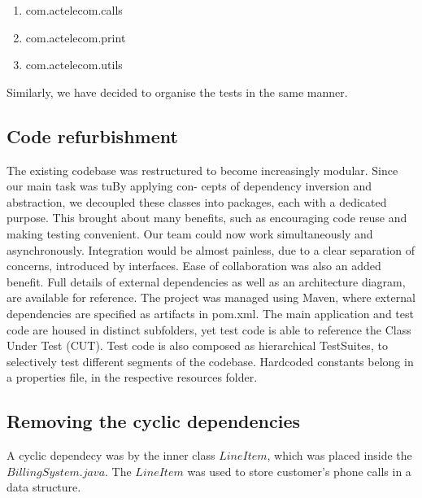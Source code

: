 \documentclass[11pt,twocolumn]{article} %
\begin{document}
\begin{enumerate}
 \item{com.actelecom.calls}
 \item{com.actelecom.print}
 \item{com.actelecom.utils}
\end{enumerate}

Similarly, we have decided to organise the tests in the same manner.




\iffalse
\subsection{Handling the cyclic dependencies}
This was caused by an inner LineItem class within BillingSystem. This was required by
BillGenerator, as it was populating a data structure containing all phone calls made by
customers.
To solve this, LineItem was extracted out into the com.acmetelecom.util subpackage,
thus removing this cyclic dependency, and at the same time, evolving the overall system
towards a more reasonable structure.
\fi

\subsection{Code refurbishment}
The existing codebase was restructured to become increasingly modular. Since our main task was tuBy applying con-
cepts of dependency inversion and abstraction, we decoupled these classes into packages,
each with a dedicated purpose.
This brought about many benefits, such as encouraging code reuse and making testing
convenient. Our team could now work simultaneously and asynchronously. Integration
would be almost painless, due to a clear separation of concerns, introduced by interfaces.
Ease of collaboration was also an added benefit.
Full details of external dependencies as well as an architecture diagram, are available for reference.
The project was managed using Maven, where external dependencies are specified as
artifacts in pom.xml. The main application and test code are housed in distinct subfolders,
yet test code is able to reference the Class Under Test (CUT). Test code is also composed
as hierarchical TestSuites, to selectively test different segments of the codebase. Hardcoded
constants belong in a properties file, in the respective resources folder.

\subsection{Removing the cyclic dependencies}
A cyclic dependecy was by the inner class $LineItem$, which was placed inside the $BillingSystem.java$.
The $LineItem$ was used to store customer's phone calls in a data structure.
\end{document}
